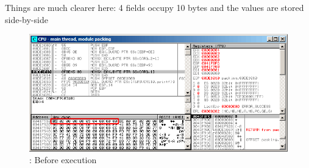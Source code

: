 Things are much clearer here: 4 fields occupy 10 bytes and the values are stored side-by-side

\begin{figure}[H]
\centering
\includegraphics[scale=\FigScale]{patterns/15_structs/4_packing/olly_packing_1.png}
\caption{\olly: Before \printf execution}
\label{fig:packing_olly_1}
\end{figure}
